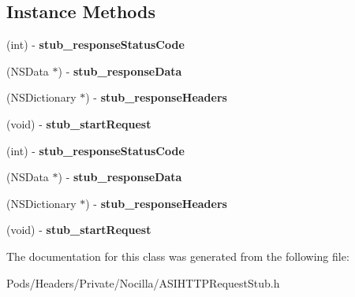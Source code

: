 \subsection*{Instance Methods}
\begin{DoxyCompactItemize}
\item 
\hypertarget{interface_a_s_i_h_t_t_p_request_stub_a58c4eb523979d51ae91625ee83127b06}{(int) -\/ {\bfseries stub\-\_\-response\-Status\-Code}}\label{interface_a_s_i_h_t_t_p_request_stub_a58c4eb523979d51ae91625ee83127b06}

\item 
\hypertarget{interface_a_s_i_h_t_t_p_request_stub_a8612a4af2906726044e70ae36b1d9754}{(N\-S\-Data $\ast$) -\/ {\bfseries stub\-\_\-response\-Data}}\label{interface_a_s_i_h_t_t_p_request_stub_a8612a4af2906726044e70ae36b1d9754}

\item 
\hypertarget{interface_a_s_i_h_t_t_p_request_stub_aac68565fbe6ba73e357d9cc1a51b04ca}{(N\-S\-Dictionary $\ast$) -\/ {\bfseries stub\-\_\-response\-Headers}}\label{interface_a_s_i_h_t_t_p_request_stub_aac68565fbe6ba73e357d9cc1a51b04ca}

\item 
\hypertarget{interface_a_s_i_h_t_t_p_request_stub_a78e50627aaf665dde22661fb6e844628}{(void) -\/ {\bfseries stub\-\_\-start\-Request}}\label{interface_a_s_i_h_t_t_p_request_stub_a78e50627aaf665dde22661fb6e844628}

\item 
\hypertarget{interface_a_s_i_h_t_t_p_request_stub_a58c4eb523979d51ae91625ee83127b06}{(int) -\/ {\bfseries stub\-\_\-response\-Status\-Code}}\label{interface_a_s_i_h_t_t_p_request_stub_a58c4eb523979d51ae91625ee83127b06}

\item 
\hypertarget{interface_a_s_i_h_t_t_p_request_stub_a8612a4af2906726044e70ae36b1d9754}{(N\-S\-Data $\ast$) -\/ {\bfseries stub\-\_\-response\-Data}}\label{interface_a_s_i_h_t_t_p_request_stub_a8612a4af2906726044e70ae36b1d9754}

\item 
\hypertarget{interface_a_s_i_h_t_t_p_request_stub_aac68565fbe6ba73e357d9cc1a51b04ca}{(N\-S\-Dictionary $\ast$) -\/ {\bfseries stub\-\_\-response\-Headers}}\label{interface_a_s_i_h_t_t_p_request_stub_aac68565fbe6ba73e357d9cc1a51b04ca}

\item 
\hypertarget{interface_a_s_i_h_t_t_p_request_stub_a78e50627aaf665dde22661fb6e844628}{(void) -\/ {\bfseries stub\-\_\-start\-Request}}\label{interface_a_s_i_h_t_t_p_request_stub_a78e50627aaf665dde22661fb6e844628}

\end{DoxyCompactItemize}


The documentation for this class was generated from the following file\-:\begin{DoxyCompactItemize}
\item 
Pods/\-Headers/\-Private/\-Nocilla/A\-S\-I\-H\-T\-T\-P\-Request\-Stub.\-h\end{DoxyCompactItemize}
